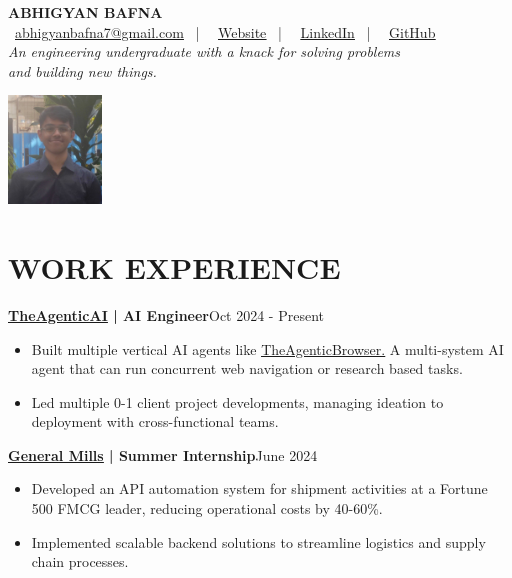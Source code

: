 \documentclass[a4paper,11pt]{article}
\newcommand{\entry}[2]{
  \noindent\textbf{#1}\hfill{#2}\\[-1em]
}
\newcommand{\contactlink}[2]{
    \href{#1}{\color{cyan}\underline{#2}}
}
\newenvironment{itemizeWithPadding}{
  \begin{itemize}
}{
  \end{itemize}
  \vspace{0.5em} %
}
\begin{document}
\begin{minipage}{0.87\textwidth}
{\headingfont\textbf{\huge ABHIGYAN BAFNA}}\\[0.5em]
\faEnvelope\,\contactlink{mailto:abhigyanbafna7@gmail.com}{abhigyanbafna7@gmail.com} \ | \
\faGlobe\,\contactlink{https://abhigyan.tech}{Website} \ | \
\faLinkedinSquare\,\contactlink{https://www.linkedin.com/in/AbhigyanBafna}{LinkedIn} \ | \
\faGithub\,\contactlink{https://github.com/AbhigyanBafna}{GitHub}\\[0.5em]
\textit{An engineering undergraduate with a knack for solving problems\\and building new things.}
\end{minipage}
\hfill
\begin{minipage}{0.13\textwidth}
\includegraphics[width=2.5cm]{profilePicture.jpg}
\end{minipage}

\section*{WORK EXPERIENCE}

\entry{\contactlink{https://www.theagentic.ai/}{TheAgenticAI} | AI Engineer}{Oct 2024 - Present}
\begin{itemizeWithPadding}
  \item Built multiple vertical AI agents like \contactlink{https://github.com/TheAgenticAI/TheAgenticBrowser}{TheAgenticBrowser.} A multi-system AI agent that can run concurrent web navigation or research based tasks.
  \item Led multiple 0-1 client project developments, managing ideation to deployment with cross-functional teams.
\end{itemizeWithPadding}

\entry{\contactlink{https://www.generalmills.co.in/}{General Mills} | Summer Internship}{June 2024}
\begin{itemizeWithPadding}
  \item Developed an API automation system for shipment activities at a Fortune 500 FMCG leader, reducing operational costs by 40-60\%.
  \item Implemented scalable backend solutions to streamline logistics and supply chain processes.
\end{itemizeWithPadding}
\end{document}
